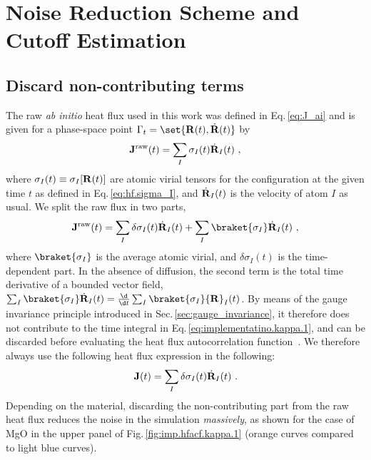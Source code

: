 


\section{Noise Reduction Scheme and Cutoff Estimation}
\subsection{Discard non-contributing terms}
The raw \emph{ab initio} heat flux used in this work was defined in Eq.\,\eqref{eq:J_ai} and is given for a phase-space point $\Gamma_t = \set{{\bf R} (t), \dot{\bf R} (t)}$ by
\begin{align}
	{\bf J}^{\rm raw} (t) = \sum_I \sigma_I (t)  \dot{\bf R}_I (t)~,
	\label{eq:imp.J.0}
\end{align}
where $\sigma_I (t) \equiv \sigma_I [{\bf R} (t)]$ are atomic virial tensors for the configuration at the given time $t$ as defined in Eq.\,\eqref{eq:hf.sigma_I}, and $\dot{\bf R}_I (t)$ is the velocity of atom $I$ as usual. We split the raw flux in two parts,
\begin{align}
	{\bf J}^{\rm raw} (t)
		= \sum_I \delta \sigma_I (t) \dot{\bf R}_I (t) 
		+ \sum_I \braket{\sigma_I} \dot{\bf R}_I (t)~,
	\label{eq:imp.J.1}
\end{align}
where $\braket{\sigma_I}$ is the average atomic virial, and $\delta \sigma_I (t)$ is the time-dependent part. In the absence of diffusion, the second term is the total time derivative of a bounded vector field, $\sum_I \braket{\sigma_I} \dot{\bf R}_I (t) = \frac{\d}{\d t} \sum_I \braket{\sigma_I} {\bf R}_I (t)$. By means of the gauge invariance principle introduced in Sec.\,\ref{sec:gauge_invariance}, it therefore does not contribute to the time integral in Eq.\,\eqref{eq:implementatino.kappa.1}, and can be discarded before evaluating the heat flux autocorrelation function~\cite{Ercole2016}. We therefore always use the following heat flux expression in the following:
\begin{align}
	{\bf J} (t)
		= \sum_I \delta \sigma_I (t) \dot{\bf R}_I (t)~.
	\label{eq:imp.J}
\end{align}
Depending on the material, discarding the non-contributing part from the raw heat flux reduces the noise in the simulation \emph{massively}, as shown for the case of MgO in the upper panel of Fig.\,\ref{fig:imp.hfacf.kappa.1} (orange curves compared to light blue curves).
